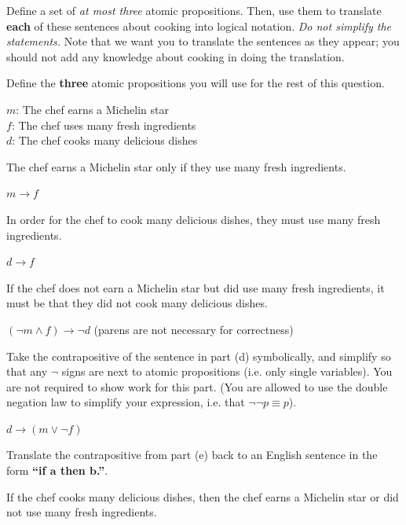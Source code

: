 \documentclass[homework, problems]{../../latex-common/cs151-common}
\begin{document}
Define a set of \textit{at most three} atomic propositions. Then, use them to translate \textbf{each} of these sentences about cooking into logical notation. \emph{Do not simplify the statements.} Note that we want you to translate the sentences as they appear; you should not add any knowledge about cooking in doing the translation.

\begin{enumeratequestions}
    \item Define the \textbf{three} atomic propositions you will use for the rest of this question.
    \begin{solution}
    $m$: The chef earns a Michelin star \\
    $f$: The chef uses many fresh ingredients \\
    $d$: The chef cooks many delicious dishes
    \end{solution}

    \solutionnewpage
    \item The chef earns a Michelin star only if they use many fresh ingredients.
    \begin{solution}
        $m \rightarrow f$
    \end{solution}
    
    \item In order for the chef to cook many delicious dishes, they must use many fresh ingredients.
    \begin{solution}
        $d \rightarrow f$
    \end{solution}
    
    \item If the chef does not earn a Michelin star but did use many fresh ingredients, it must be that they did not cook many delicious dishes.
    \begin{solution}
        $(\neg m \land f) \rightarrow \neg d$ (parens are not necessary for correctness)
    \end{solution}

    \item Take the contrapositive of the sentence in part (d) symbolically, and simplify so that any $\neg$ signs are next to atomic propositions (i.e. only single variables). You are not required to show work for this part. (You are allowed to use the double negation law to simplify your expression, i.e. that $\neg \neg p \equiv p$).
    \begin{solution}
     $d \rightarrow (m \lor \neg f)$
    \end{solution}

    \item Translate the contrapositive from part (e) back to an English sentence in the form \textbf{``if $\bm{a}$ then $\bm{b}$.”}.
    \begin{solution}
        If the chef cooks many delicious dishes, then the chef earns a Michelin star or did not use many fresh ingredients.
    \end{solution}
\end{enumeratequestions}
\end{document}
